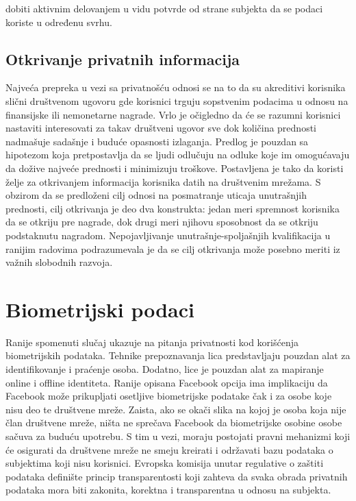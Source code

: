 \documentclass[a4paper]{article}
\begin{document}
dobiti aktivnim delovanjem u vidu potvrde od strane subjekta da se podaci koriste u određenu svrhu.

\subsection{Otkrivanje privatnih informacija}
Najveća prepreka u vezi sa privatnošću odnosi se na to da su akreditivi korisnika slični društvenom ugovoru gde korisnici trguju sopstvenim podacima u odnosu na finansijske ili nemonetarne nagrade. Vrlo je očigledno da će se razumni korisnici nastaviti interesovati za takav društveni ugovor sve dok količina prednosti nadmašuje sadašnje i buduće opasnosti izlaganja. Predlog je pouzdan sa hipotezom  koja pretpostavlja da se ljudi odlučuju   na odluke  koje im omogućavaju   da dožive najveće prednosti i minimizuju troškove. Postavljena je tako da koristi želje za otkrivanjem informacija korisnika datih na  društvenim mrežama.  S obzirom da  se  predloženi cilj odnosi na posmatranje uticaja unutrašnjih  prednosti, cilj otkrivanja je deo dva konstrukta: jedan   meri spremnost korisnika da se otkriju pre nagrade, dok drugi meri njihovu sposobnost da se otkriju podstaknutu nagradom. Nepojavljivanje unutrašnje-spoljašnjih kvalifikacija u ranijim radovima  podrazumevala je da se cilj otkrivanja može posebno meriti iz važnih slobodnih razvoja.

\newpage

\section{Biometrijski podaci}
Ranije spomenuti slučaj ukazuje na pitanja privatnosti kod korišćenja biometrijskih podataka. Tehnike prepoznavanja lica predstavljaju pouzdan alat za identifikovanje i praćenje osoba.
Dodatno, lice je pouzdan alat za mapiranje online i offline identiteta. Ranije opisana Facebook opcija ima implikaciju da Facebook može prikupljati osetljive biometrijske podatake čak i za osobe koje nisu deo te društvene mreže. Zaista, ako se okači slika na kojoj je osoba koja nije član društvene mreže, ništa ne sprečava Facebook da biometrijske osobine osobe sačuva za buduću upotrebu. S tim u vezi, moraju postojati pravni mehanizmi koji će osigurati da društvene mreže ne smeju kreirati i održavati bazu podataka o subjektima koji nisu korisnici. Evropska komisija unutar regulative o zaštiti
podataka definište princip transparentosti koji zahteva da svaka obrada privatnih podataka mora biti zakonita, korektna i transparentna u odnosu na subjekta.
\end{document}
